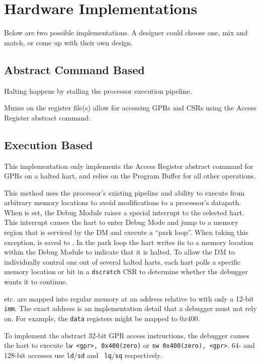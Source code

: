 \chapter{Hardware Implementations}
\label{sec:implementations}

Below are two possible implementations. A designer could choose one, mix and
match, or come up with their own design.

\section{Abstract Command Based}

Halting happens by stalling the processor execution pipeline.

Muxes on the register file(s) allow for accessing GPRs and CSRs
using the Access Register abstract command.

\section{Execution Based}

This implementation only implements the Access Register abstract command
for GPRs on a halted hart, and relies on the Program Buffer for all other
operations.

This method uses the processor's existing pipeline
and ability to execute from arbitrary memory locations to avoid
modifications to a processor's datapath.
When \Fhaltreq is set, the Debug Module raises a special interrupt
to the selected hart. This interrupt causes the
hart to enter Debug Mode and jump to a 
memory region that is serviced by the DM and execute a ``park loop''.
When taking this exception, \Rpc is saved to \Rdpc.
In
the park loop the hart writes its \Rmhartid to a memory location within the Debug
Module to indicate that it is halted.
To allow the DM to individually control one out of several
halted harts, each hart polls a specific memory location or bit in a {\tt dscratch}
CSR to determine whether the debugger wants it to continue.

\Rdatazero etc. are mapped into regular memory at an address relative to \Rzero
with only a 12-bit {\tt imm}. The exact address is an implementation
detail that a debugger must not rely on. For example, the {\tt data}
registers might be mapped to $0x400$.

To implement the abstract 32-bit GPR access instructions, the debugger causes
the hart to  execute {\tt lw <gpr>, 0x400(zero)} or {\tt sw 0x400(zero), <gpr>}.
64- and 128-bit accesses use {\tt ld}/{\tt sd} and {\tt
lq}/{\tt sq} respectively.

